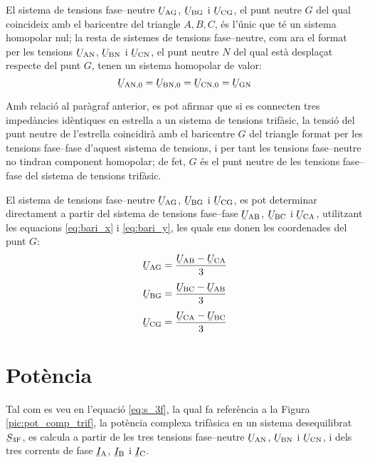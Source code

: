 El sistema de tensions fase--neutre
$\cmplx{U}\ped{AG}$, $\cmplx{U}\ped{BG}$ i $\cmplx{U}\ped{CG}$,
el punt neutre $G$ del qual coincideix amb el baricentre del
triangle $A, B,
 C$, és l'únic que té un sistema homopolar nul; la resta de sistemes de tensions
 fase--neutre, com ara el format per les tensions $\cmplx{U}\ped{AN}$, $\cmplx{U}\ped{BN}$ i $\cmplx{U}\ped{CN}$,
 el punt neutre $N$ del qual està desplaçat respecte del punt $G$, tenen un sistema
 homopolar de valor:
\begin{equation}
    \cmplx{U}\ped{AN,0} = \cmplx{U}\ped{BN,0} =
    \cmplx{U}\ped{CN,0} = \cmplx{U}\ped{GN}\label{eq:tens-hom}
\end{equation}

Amb relació al paràgraf anterior, es pot afirmar que si es
connecten tres impedàncies idèntiques en estrella a un sistema
de tensions trifàsic, la tensió del punt neutre de l'estrella
coincidirà amb el baricentre $G$ del triangle format per les tensions
fase--fase d'aquest sistema de tensions, i per tant les tensions fase--neutre no tindran
component homopolar; de fet, $G$ és el punt neutre de les tensions
fase--fase del sistema de tensions trifàsic.

El sistema de tensions fase--neutre
$\cmplx{U}\ped{AG}$, $\cmplx{U}\ped{BG}$ i $\cmplx{U}\ped{CG}$, es pot determinar directament a partir del sistema de tensions fase--fase $\cmplx{U}\ped{AB}$, $\cmplx{U}\ped{BC}$ i $\cmplx{U}\ped{CA}$, utilitzant les equacions \eqref{eq:bari_x} i \eqref{eq:bari_y}, les quals ens donen les coordenades del punt $G$:
\begin{subequations}
\begin{align}
    \cmplx{U}\ped{AG} &= \frac{\cmplx{U}\ped{AB}-\cmplx{U}\ped{CA}}{3}\label{eq:uag}\\[1ex]
    \cmplx{U}\ped{BG} &= \frac{\cmplx{U}\ped{BC}-\cmplx{U}\ped{AB}}{3}\label{eq:ubg}\\[1ex]
    \cmplx{U}\ped{CG} &= \frac{\cmplx{U}\ped{CA}-\cmplx{U}\ped{BC}}{3}\label{eq:ucg}
\end{align}
\end{subequations}

\section{Potència} 

Tal com es veu en l'equació \eqref{eq:s_3f}, la qual fa referència a
la Figura \vref{pic:pot_comp_trif}, la potència complexa trifàsica
en un sistema desequilibrat $\cmplx{S}\ped{3F}$, es calcula a partir
de les tres tensions fase--neutre $\cmplx{U}\ped{AN}$,
$\cmplx{U}\ped{BN}$ i $\cmplx{U}\ped{CN}$, i dels tres
corrents de fase $\cmplx{I}\ped{A}$, $\cmplx{I}\ped{B}$ i
$\cmplx{I}\ped{C}$.


